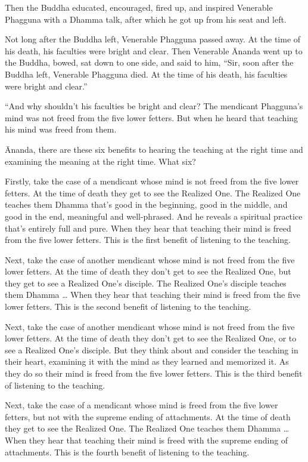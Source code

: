 \documentclass[12pt,openany]{book}%
\begin{document}
Then the Buddha educated, encouraged, fired up, and inspired Venerable Phagguna with a Dhamma talk, after which he got up from his seat and left. 

Not long after the Buddha left, Venerable Phagguna passed away. At the time of his death, his faculties were bright and clear. Then Venerable Ānanda went up to the Buddha, bowed, sat down to one side, and said to him, “Sir, soon after the Buddha left, Venerable Phagguna died. At the time of his death, his faculties were bright and clear.” 

“And why shouldn’t his faculties be bright and clear? The mendicant Phagguna’s mind was not freed from the five lower fetters. But when he heard that teaching his mind was freed from them. 

Ānanda, there are these six benefits to hearing the teaching at the right time and examining the meaning at the right time. What six? 

Firstly, take the case of a mendicant whose mind is not freed from the five lower fetters. At the time of death they get to see the Realized One. The Realized One teaches them Dhamma that’s good in the beginning, good in the middle, and good in the end, meaningful and well-phrased. And he reveals a spiritual practice that’s entirely full and pure. When they hear that teaching their mind is freed from the five lower fetters. This is the first benefit of listening to the teaching. 

Next, take the case of another mendicant whose mind is not freed from the five lower fetters. At the time of death they don’t get to see the Realized One, but they get to see a Realized One’s disciple. The Realized One’s disciple teaches them Dhamma … When they hear that teaching their mind is freed from the five lower fetters. This is the second benefit of listening to the teaching. 

Next, take the case of another mendicant whose mind is not freed from the five lower fetters. At the time of death they don’t get to see the Realized One, or to see a Realized One’s disciple. But they think about and consider the teaching in their heart, examining it with the mind as they learned and memorized it. As they do so their mind is freed from the five lower fetters. This is the third benefit of listening to the teaching. 

Next, take the case of a mendicant whose mind is freed from the five lower fetters, but not with the supreme ending of attachments. At the time of death they get to see the Realized One. The Realized One teaches them Dhamma … When they hear that teaching their mind is freed with the supreme ending of attachments. This is the fourth benefit of listening to the teaching. 
\end{document}
